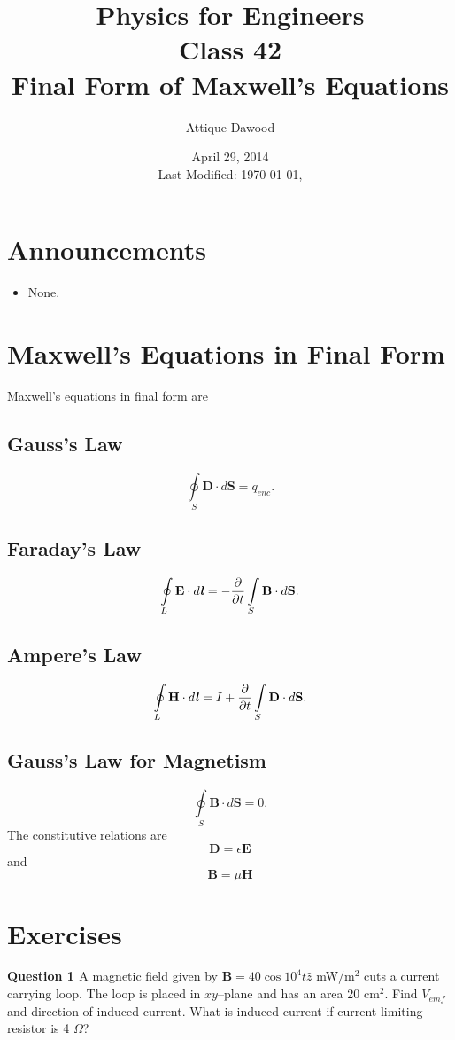 \documentclass[12pt,a4paper]{article}
\title{\vspace{-3cm}Physics for Engineers\\Class 42\\Final Form of Maxwell's Equations}
\author{Attique Dawood}
\date{April 29, 2014\\[0.2cm] Last Modified: \today, \currenttime}
\begin{document}
\maketitle
\section{Announcements}
\begin{itemize}
\item None.
\end{itemize}
\section{Maxwell's Equations in Final Form}
Maxwell's equations in final form are
\subsection{Gauss's Law}
\begin{equation}
\oint\limits_{S} \textbf{D}\cdot d\textbf{S}=q_{enc}.
\end{equation}
\subsection{Faraday's Law}
\begin{equation}
\oint\limits_{L} \textbf{E}\cdot d\textbf{\textit{l}}=-\dfrac{\partial}{\partial t}\int\limits_{S}\textbf{B}\cdot d\textbf{S}.
\end{equation}
\subsection{Ampere's Law}
\begin{equation}
\oint\limits_{L} \textbf{H}\cdot d\textbf{\textit{l}}=I+\dfrac{\partial}{\partial t}\int\limits_{S}\textbf{D}\cdot d\textbf{S}.
\end{equation}
\subsection{Gauss's Law for Magnetism}
\begin{equation}
\oint\limits_{S} \textbf{B}\cdot d\textbf{S}=0.
\end{equation}
The constitutive relations are
\begin{equation}
\textbf{D}=\epsilon\textbf{E}
\end{equation}
and
\begin{equation}
\textbf{B}=\mu\textbf{H}
\end{equation}
\section{Exercises}
\noindent\textbf{Question 1 \cite[Problem 9.4, page 404]{Sadiku}} A magnetic field given by $\textbf{B}=40\cos 10^4 t\hat z$ mW/m$^2$ cuts a current carrying loop. The loop is placed in $xy$--plane and has an area 20 cm$^2$. Find $V_{emf}$ and direction of induced current. What is induced current if current limiting resistor is 4 $\Omega$?


\end{document}
